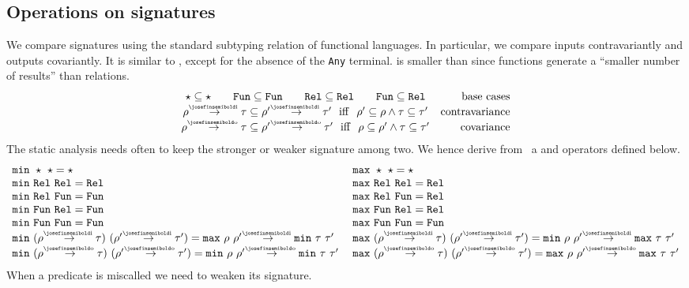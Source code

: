 \subsection{Operations on signatures}
\label{sec:static}
We compare signatures using the standard subtyping relation of functional
languages. In particular, we compare inputs contravariantly and outputs
covariantly. It is similar to
\cite{hanus2025}, except for the absence of the \texttt{Any} terminal.
\detI is smaller than \relI since functions generate a ``smaller number
of results'' than relations.
%
$$
\begin{array}{cr}
\star \mySub \star \qquad \detI \mySub \detI \qquad \relI \mySub \relI \qquad\detI \mySub \relI & \text{base cases} \\
\rho \toI \tau \mySub \rho' \toI \tau'  \mathrm{~~iff~~} \rho' \mySub \rho \land \tau \mySub \tau' & \text{contravariance}\\
\rho \toO \tau \mySub \rho' \toO \tau'  \mathrm{~~iff~~} \rho \mySub \rho' \land \tau \mySub \tau' & \text{covariance}  
\end{array}
$$
%
The static analysis needs often to keep the stronger or weaker signature among
two. We hence derive from \mySub\ a \minT and \maxT operators defined below.
%
$$
\begin{array}{l}
\minT\ \star\ \star = \star\\
\minT\ \relI \ \relI = \relI \\
\minT\ \relI \ \detI = \detI \\
\minT\ \detI \ \relI = \detI \\
\minT\ \detI \ \detI = \detI \\
\minT\ (\rho \toI \tau)\ (\rho' \toI \tau') = \maxT\ \rho\ \rho' \toI \minT\ \tau\ \tau' \\
\minT\ (\rho \toO \tau)\ (\rho' \toO \tau') = \minT\ \rho\ \rho' \toO \minT\ \tau\ \tau'
\end{array}
\;
\begin{array}{l}
\maxT\ \star\ \star = \star\\
\maxT\ \relI \ \relI = \relI \\
\maxT\ \relI \ \detI = \relI \\
\maxT\ \detI \ \relI = \relI \\
\maxT\ \detI \ \detI = \detI \\
\maxT\ (\rho \toI \tau)\ (\rho' \toI \tau') = \minT\ \rho\ \rho' \toI \maxT\ \tau\ \tau'\\
\maxT\ (\rho \toO \tau)\ (\rho' \toO \tau') = \maxT\ \rho\ \rho' \toO \maxT\ \tau\ \tau'
\end{array}
$$
%
When a predicate is miscalled we need to weaken its signature. 

